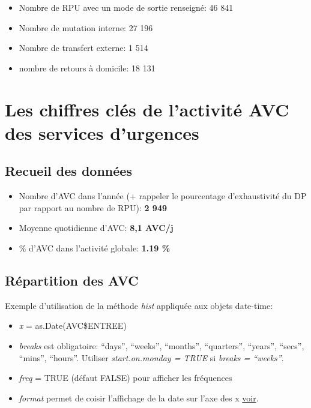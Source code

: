 \documentclass[]{article}
\begin{document}
\begin{itemize}
\itemsep1pt\parskip0pt
\item
  Nombre de RPU avec un mode de sortie renseigné: 46 841
\item
  Nombre de mutation interne: 27 196
\item
  Nombre de transfert externe: 1 514
\item
  nombre de retours à domicile: 18 131
\end{itemize}

\section{Les chiffres clés de l'activité AVC des services
d'urgences}\label{les-chiffres-cles-de-lactivite-avc-des-services-durgences}

\subsection{Recueil des données}\label{recueil-des-donnees-3}

\begin{itemize}
\itemsep1pt\parskip0pt
\item
  Nombre d'AVC dans l'année (+ rappeler le pourcentage d'exhaustivité du
  DP par rapport au nombre de RPU): \textbf{2 949}
\item
  Moyenne quotidienne d'AVC: \textbf{8,1 AVC/j}
\item
  \% d'AVC dans l'activité globale: \textbf{1.19 \%}
\end{itemize}

\subsection{Répartition des AVC}\label{repartition-des-avc}

Exemple d'utilisation de la méthode \emph{hist} appliquée aux objets
date-time:

\begin{itemize}
\itemsep1pt\parskip0pt
\item
  \emph{x} = as.Date(AVC\$ENTREE)
\item
  \emph{breaks} est obligatoire: ``days'', ``weeks'', ``months'',
  ``quarters'', ``years'', ``secs'', ``mins'', ``hours''. Utiliser
  \emph{start.on.monday = TRUE} si \emph{breaks = ``weeks''}.
\item
  \emph{freq} = TRUE (défaut FALSE) pour afficher les fréquences
\item
  \emph{format} permet de coisir l'affichage de la date sur l'axe des x
  \href{https://stat.ethz.ch/R-manual/R-devel/library/base/html/strptime.html}{voir}.
\end{itemize}
\end{document}
